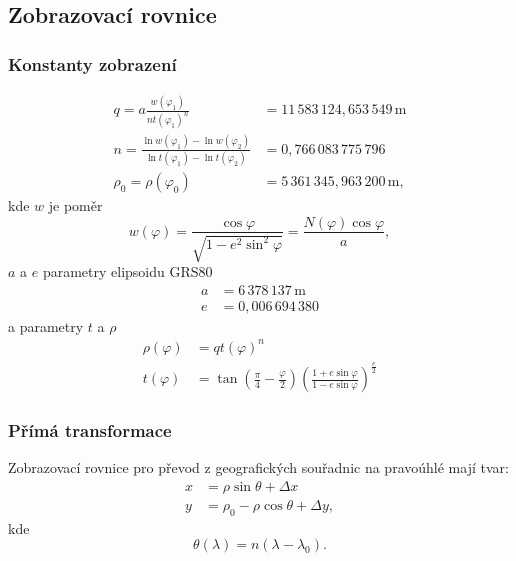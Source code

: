 \documentclass[a4paper]{article}
\begin{document}
\subsection{Zobrazovací rovnice}
\subsubsection{Konstanty zobrazení}
\begin{align*}
q = a \frac{w(\varphi_1)}{n t(\varphi_1)^n} &= 11\,583\,124,653\,549\,\mathrm{m}\\
n = \frac{\ln{w(\varphi_1)} - \ln{w(\varphi_2)}}{\ln{t(\varphi_1)} - \ln{t(\varphi_2)}} &= 0,766\,083\,775\,796\\
\rho_0 = \rho(\varphi_0) &= 5\,361\,345,963\,200\,\mathrm{m},
\end{align*}
kde $w$ je poměr
\begin{equation*}
w(\varphi) = \frac{\cos{\varphi}}{\sqrt{1 - e^2 \sin^2{\varphi}}} = \frac{N(\varphi) \cos{\varphi}}{a},
\end{equation*}
$a$ a $e$ parametry elipsoidu GRS80
\begin{align*}
a &= 6\,378\,137\,\mathrm{m}\\
e &= 0,006\,694\,380
\end{align*}
a parametry $t$ a $\rho$
\begin{align*}
\rho(\varphi) &= q t(\varphi)^n\\
t(\varphi) &= \tan{\left(\frac{\pi}{4} - \frac{\varphi}{2}\right)}\left(\frac{1+e\sin{\varphi}}{1-e\sin{\varphi}}\right)^{\frac{e}{2}}
\end{align*}

\subsubsection{Přímá transformace}
Zobrazovací rovnice pro převod z geografických souřadnic na pravoúhlé mají tvar:
\begin{align*}
x &= \rho \sin{\theta} + \Delta x\\
y &= \rho_0 - \rho \cos{\theta} + \Delta y,
\end{align*}
kde
\begin{equation*}
\theta(\lambda) = n (\lambda - \lambda_0).
\end{equation*}
  
\end{document}
